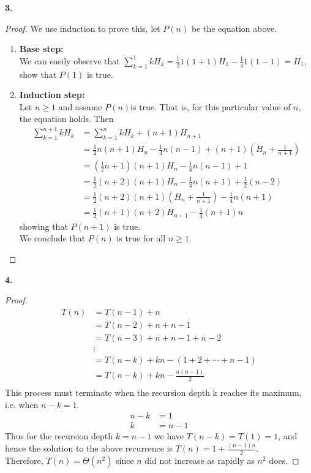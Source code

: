 \documentclass[12pt]{article}
\begin{document}
\noindent \textbf{3.}
\begin{proof}
		We use induction to prove this, let $P(n)$ be the equation above.
	\begin{enumerate}
		\item \textbf{Base step:}\\
		We can easily observe that $\sum_{k=1}^{1}kH_k=\frac{1}{2}1(1+1)H_1-\frac{1}{4}1(1-1)=H_1$, show that $P(1)$ is true.
		\item \textbf{Induction step:}\\
		Let $n\ge1$ and assume $P(n)$is true. That is, for this particular value of $n$, the
		equation holds. Then
		\begin{align*}
			\sum_{k=1}^{n+1}kH_k&=\sum_{k=1}^{n}kH_k+(n+1)H_{n+1}\\
			&=\frac{1}{2}n(n+1)H_{n}-\frac{1}{4}n(n-1)+(n+1)(H_{n}+\frac{1}{n+1})\\
			&=(\frac{1}{2}n+1)(n+1)H_{n}-\frac{1}{4}n(n-1)+1\\
			&=\frac{1}{2}(n+2)(n+1)H_{n}-\frac{1}{4}n(n+1)+\frac{1}{2}(n-2)\\
			&=\frac{1}{2}(n+2)(n+1)(H_{n}+\frac{1}{n+1})-\frac{1}{4}n(n+1)\\
			&=\frac{1}{2}(n+1)(n+2)H_{n+1}-\frac{1}{4}(n+1)n
		\end{align*}	
		\qquad showing that $P(n+1)$ is true.\\
		We conclude that $P(n)$ is true for all $n\ge1$.
	\end{enumerate}
\end{proof}

\noindent \textbf{4.}
\begin{proof}
	\begin{align*}
		T(n)&=T(n-1)+n\\
		&=T(n-2)+n+n-1\\
		&=T(n-3)+n+n-1+n-2\\
		&\vdots\\
		&=T(n-k)+kn-(1+2+\cdots+n-1)\\
		&=T(n-k)+kn-\frac{n(n-1)}{2}\\
	\end{align*}
This process must terminate when the recursion depth k reaches its maximum, i.e. when $n-k=1$.
\begin{align*}
	n-k&=1\\
	k&=n-1
\end{align*}
Thus for the recursion depth $k=n-1$ we have $T(n-k)=T(1)=1$, and hence the solution to the above recurrence is $T(n)=1+\frac{(n-1)n}{2}$.\\
Therefore, $T(n)=\Theta(n^2)$ since $n$ did not increase as rapidly as $n^2$ does.
\end{proof}
\end{document}
